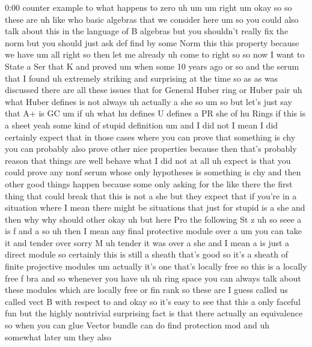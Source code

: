 \begin{unfinished}{0:00}
counter  example  to  what  happens  to  zero
uh
um
um  right
um  okay  so  so  these  are  uh  like  who
basic
algebras  that  we  consider  here  um  so  you
could  also  talk  about  this  in  the
language  of  B  algebras  but  you  shouldn't
really  fix  the  norm  but  you  should  just
ask  def  find  by  some  Norm  this  this
property  because  we
have
um  all  right  so  then  let  me
already  uh  come
to  right  so
so  now  I  want  to  State  a  Ser  that  K  and
proved
um  when  some  10  years  ago  or  so  and  the
serum  that  I  found  uh  extremely  striking
and  surprising  at  the  time  so  as  as  was
discussed  there  are  all  these  issues
that  for  General  Huber  ring  or  Huber
pair
uh  what  Huber  defines  is  not  always  uh
actually  a  she  so  um  so  but  let's  just
say  that
A+  is
GC  um  if  uh  what  hu
defines  U  defines  a  PR  she  of  hu
Rings  if  this  is  a
sheet  yeah  some  kind  of  stupid
definition
um  and  I  did  not  I  mean  I  did  certainly
expect  that  in  those  cases  where  you  can
prove  that  something  is  chy  you  can
probably  also  prove  other  nice
properties  because  then  that's  probably
reason  that  things  are  well  behave  what
I  did  not  at  all  uh  expect  is  that  you
could  prove  any  nonf  serum  whose  only
hypotheses  is  something  is  chy  and  then
other  good  things  happen  because  some
only  asking  for  the  like  there  the  first
thing  that  could  break  that  this  is  not
a  she  but  they  expect  that  if  you're  in
a  situation  where  I  mean  there  might  be
situations  that  just  for  stupid  is  a  she
and  then  why  why  should  other  okay  uh
but  here  Pro  the  following  St
z
uh  so  seee  a  is
f  and
a
so
uh
then  I  mean  any  final  protective
module  over
a  um  you  can  take  it  and  tender  over
sorry  M  uh
tender  it  was  over
a
she  and  I  mean  a  is  just  a  direct
module  so  certainly  this  is  still  a
sheath  that's  good  so  it's  a  sheath  of
finite  projective  modules  um  actually
it's  one  that's  locally  free  so  this  is
a  locally
free  f
bra  and  so  whenever  you  have
uh  uh  ring  space  you  can  always  talk
about  these  modules  which  are  locally
free  or  fin
rank  so  these  are  I  guess  called  us
called  vect
B  with  respect
to  and  okay  so  it's  easy  to  see  that
this  a  only  faceful  fun  but  the  highly
nontrivial  surprising  fact  is  that  there
actually  an  equivalence  so  when  you  can
glue  Vector
bundle
can  do  find  protection
mod  and  uh  somewhat  later  um  they  also

\end{unfinished}
